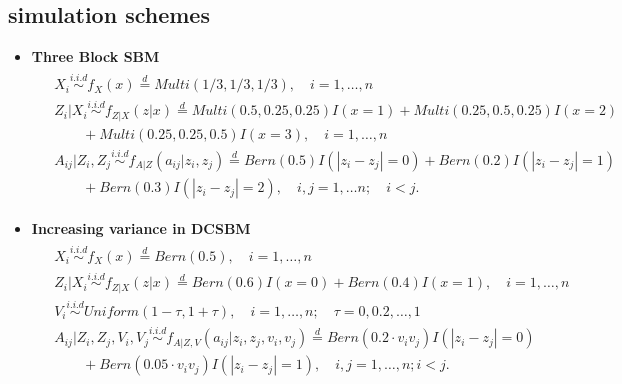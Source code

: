 \documentclass[12pt]{article}
\theoremstyle{definition}
\begin{document}
\subsection{simulation schemes}
\begin{itemize}	

	\item \textbf{Three Block SBM}
	\begin{equation}
	\label{eq:Three}
	\begin{gathered}
	\begin{aligned}
	&  X_{i} \overset{i.i.d}{\sim} f_{X}(x)   \stackrel{d}{=}  Multi(1/3, 1/3, 1/3), \quad i = 1, \ldots , n \\ 
	&  Z_{i} | X_{i}  \overset{i.i.d}{\sim}    f_{Z|X}(z|x)  \stackrel{d}{=}   Multi(0.5, 0.25, 0.25) I( x = 1 ) +   Multi(0.25, 0.5, 0.25) I (x = 2)  \qquad  \\ & \quad \quad + Multi(0.25, 0.25, 0.5)I(x = 3), \quad  i = 1,\ldots,n  \\
	&  A_{ij} | Z_{i}, Z_{j}   \overset{i.i.d}{\sim}   f_{A|Z}(a_{ij} | z_{i}, z_{j}) \stackrel{d}{=}  Bern(0.5) I ( |z_{i} - z_{j}| = 0 )  + Bern(0.2) I(|z_{i} - z_{j}| = 1) \\ & \quad \quad + Bern(0.3) I (|z_{i} - z_{j}| = 2),  \quad i,j=1, \ldots n ; \quad i < j.
	\end{aligned}
	\end{gathered}
	\end{equation}
	
\item \textbf{Increasing variance in DCSBM}
	\begin{equation}
	\label{eq:dcVariance}
	\begin{gathered}
	\begin{aligned}
	&  X_{i} \overset{i.i.d}{\sim} f_{X}(x)   \stackrel{d}{=}  Bern(0.5), \quad i = 1, \ldots , n \\ 
	&  Z_{i} | X_{i}  \overset{i.i.d}{\sim}    f_{Z|X}(z|x)  \stackrel{d}{=}   Bern(0.6) I( x = 0 ) +   Bern(0.4) I (x = 1), \quad  i = 1,\ldots,n  \\
	& V_{i} \overset{i.i.d}{\sim} Uniform(1 - \tau, 1 + \tau),\quad i = 1, \ldots, n; \quad \tau = 0, 0.2, \ldots, 1\\ 
	& A_{ij} | Z_{i}, Z_{j}, V_{i}, V_{j}   \overset{i.i.d}{\sim}   f_{A|Z, V}(a_{ij} | z_{i}, z_{j}, v_{i}, v_{j}) \stackrel{d}{=} Bern(0.2 \cdot v_{i} v_{j}) I ( |z_{i} - z_{j}| = 0 ) \\ & \quad \quad + Bern(0.05 \cdot v_{i} v_{j} ) I(|z_{i} - z_{j}| = 1), \quad i,j=1, \ldots, n; i < j. 
	\end{aligned}
	\end{gathered}
	\end{equation}


\end{itemize}
\end{document}
